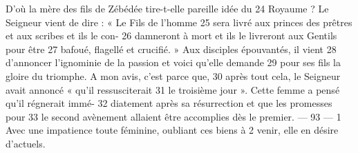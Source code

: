 D'où la mère des fils de Zébédée tire-t-elle pareille idée du	 
24	 	Royaume ? Le Seigneur vient de dire : « Le Fils de l'homme	 
25	 	sera livré aux princes des prêtres et aux scribes et ils le con-	 
26	 	damneront à mort et ils le livreront aux Gentils pour être	 
27	 	bafoué, flagellé et crucifié. » Aux disciples épouvantés, il vient	 
28	 	d'annoncer l'ignominie de la passion et voici qu'elle demande	 
29	 	pour ses fils la gloire du triomphe. A mon avis, c'est parce que,	 
30	 	après tout cela, le Seigneur avait annoncé « qu'il ressusciterait	 
31	 	le troisième jour ». Cette femme a pensé qu'il régnerait immé-	 
32	 	diatement après sa résurrection et que les promesses pour	 
33	 	le second avènement allaient être accomplies dès le premier.	 
 	--- 93 ---	 
1	 	Avec une impatience toute féminine, oubliant ces biens à	 
2	 	venir, elle en désire d'actuels.